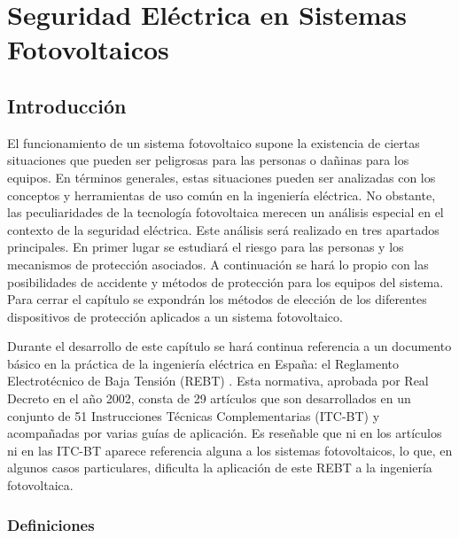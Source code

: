 
\chapter{Seguridad Eléctrica en Sistemas Fotovoltaicos}
\label{sec:seguridad}

\section{Introducción}

El funcionamiento de un sistema fotovoltaico supone la existencia
de ciertas situaciones que pueden ser peligrosas para las personas
o dañinas para los equipos. En términos generales, estas situaciones
pueden ser analizadas con los conceptos y herramientas de uso común
en la ingeniería eléctrica. No obstante, las peculiaridades de la
tecnología fotovoltaica merecen un análisis especial en el contexto
de la seguridad eléctrica. Este análisis será realizado en tres apartados
principales. En primer lugar se estudiará el riesgo para las personas
y los mecanismos de protección asociados. A continuación se hará lo
propio con las posibilidades de accidente y métodos de protección
para los equipos del sistema. Para cerrar el capítulo se expondrán
los métodos de elección de los diferentes dispositivos de protección
aplicados a un sistema fotovoltaico.

Durante el desarrollo de este capítulo se hará continua referencia
a un documento básico en la práctica de la ingeniería eléctrica en
España: el Reglamento Electrotécnico de Baja Tensión (REBT) \citep{RD_842_2002}.
Esta normativa, aprobada por Real Decreto en el año 2002, consta de
29 artículos que son desarrollados en un conjunto de 51 Instrucciones
Técnicas Complementarias (ITC-BT) y acompañadas por varias guías de
aplicación. Es reseñable que ni en los artículos ni en las ITC-BT
aparece referencia alguna a los sistemas fotovoltaicos, lo que, en
algunos casos particulares, dificulta la aplicación de este REBT a
la ingeniería fotovoltaica.


\subsection{Definiciones}

